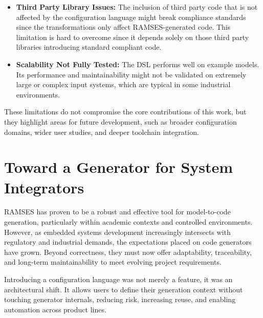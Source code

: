 \begin{itemize}
	\item \textbf{Third Party Library Issues:} The inclusion of third party code that is not affected by the configuration language might break compliance standards since the transformations only affect \gls{RAMSES}-generated code. This limitation is hard to overcome since it depends solely on those third party libraries introducing standard compliant code.
	
	\item \textbf{Scalability Not Fully Tested:} The \gls{DSL} performs well on example models. Its performance and maintainability might not be validated on extremely large or complex input systems, which are typical in some industrial environments.
	
\end{itemize}

These limitations do not compromise the core contributions of this work, but they highlight areas for future development, such as broader configuration domains, wider user studies, and deeper toolchain integration.


\section{Toward a Generator for System Integrators}
\label{sec:conclusion_configurable_generation}

\gls{RAMSES} has proven to be a robust and effective tool for model-to-code generation, particularly within academic contexts and controlled environments. However, as embedded systems development increasingly intersects with regulatory and industrial demands, the expectations placed on code generators have grown. Beyond correctness, they must now offer adaptability, traceability, and long-term maintainability to meet evolving project requirements.

Introducing a configuration language was not merely a feature, it was an architectural shift. It allows users to define their generation context without touching generator internals, reducing risk, increasing reuse, and enabling automation across product lines.












